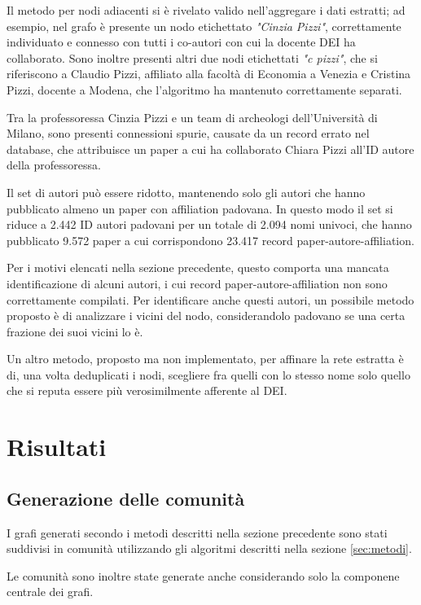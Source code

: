\documentclass[12pt,a4paper,twoside]{report}
\begin{document}
Il metodo per nodi adiacenti si è rivelato valido nell'aggregare i dati estratti; ad esempio, nel
grafo è presente un nodo etichettato \textit{"Cinzia Pizzi"}, correttamente individuato e connesso
con tutti i co-autori con cui la docente DEI ha collaborato. Sono inoltre presenti
altri due nodi etichettati \textit{"c pizzi"}, che si riferiscono a Claudio Pizzi, affiliato alla
facoltà di Economia a Venezia e Cristina Pizzi, docente a Modena, che l'algoritmo ha mantenuto
correttamente separati.

Tra la professoressa Cinzia Pizzi e un team di archeologi dell'Università di Milano, sono presenti
connessioni spurie, causate da un record errato nel database, che attribuisce un paper a cui ha
collaborato Chiara Pizzi all'ID autore della professoressa.

Il set di autori può essere ridotto, mantenendo solo gli autori che hanno pubblicato almeno un paper
con affiliation padovana. In questo modo il set si riduce a 2.442 ID autori padovani per un totale
di 2.094 nomi univoci, che hanno pubblicato 9.572 paper a cui corrispondono 23.417 record
paper-autore-affiliation.

Per i motivi elencati nella sezione precedente, questo comporta una mancata identificazione di
alcuni autori, i cui record paper-autore-affiliation non sono correttamente compilati. Per
identificare anche questi autori, un possibile metodo proposto è di analizzare i vicini del nodo,
considerandolo padovano se una certa frazione dei suoi vicini lo è.

Un altro metodo, proposto ma non implementato, per affinare la rete estratta è di, una volta
deduplicati i nodi, scegliere fra quelli con lo stesso nome solo quello che si reputa essere più
verosimilmente afferente al DEI.


\whitePage
\chapter{Risultati} \label{cap:risultati}

\section{Generazione delle comunità}

I grafi generati secondo i metodi descritti nella sezione precedente sono stati suddivisi in
comunità utilizzando gli algoritmi descritti nella sezione \ref{sec:metodi}.

Le comunità sono inoltre state generate anche considerando solo la componene centrale dei grafi.
\end{document}
